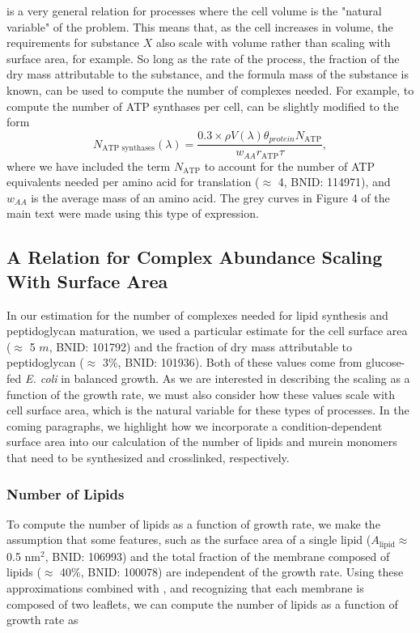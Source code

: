  is a very general relation for processes where the
cell volume is the "natural variable" of the problem. This means that, as the
cell increases in volume, the requirements for substance $X$ also scale with
volume rather than scaling with surface area, for example. So long as the rate
of the process, the fraction of the dry mass attributable to the substance, and
the formula mass of the substance is known,  can be
used to compute the number of complexes needed. For example, to compute the
number of ATP synthases per cell,  can be slightly
modified to the form
\begin{equation}
    N_\text{ATP synthases}(\lambda) = \frac{0.3 \times \rho V(\lambda)\theta_{protein}N_\text{ATP}}{w_{AA} r_\text{ATP} \tau},
\end{equation}
where we have included the term $N_\text{ATP}$ to account for the number of ATP
equivalents needed per amino acid for translation ($\approx$ 4, BNID: 114971),
and $w_{AA}$ is the average mass of an amino acid. The grey curves in Figure 4
of the main text were made using this type of expression.

\subsection{A Relation for Complex Abundance Scaling With Surface Area}
In our estimation for the number of complexes needed for lipid synthesis and
peptidoglycan maturation, we used a particular estimate for the cell surface
area ($\approx$ 5 \textmu$m$, BNID: 101792) and the fraction of dry mass
attributable to peptidoglycan ($\approx$ 3\%, BNID: 101936). Both of these
values come from glucose-fed \textit{E. coli} in balanced growth. As we are
interested in describing the scaling as a function of the growth rate, we must
also consider how these values scale with cell surface area, which is the natural
variable for these types of processes. In the coming paragraphs, we highlight
how we incorporate a condition-dependent surface area into our calculation of
the number of lipids and murein monomers that need to be synthesized and
crosslinked, respectively.

\subsubsection{Number of Lipids}
To compute the number of lipids as a function of growth rate, we make the
assumption that some features, such as the surface area of a single lipid
($A_\text{lipid} \approx$ 0.5 nm$^2$, BNID: 106993) and the total fraction of the membrane
composed of lipids ($\approx$ 40\%, BNID: 100078) are independent of the growth
rate. Using these approximations combined with , and
recognizing that each membrane is composed of two leaflets, we can
compute the number of lipids as a function of growth rate as

